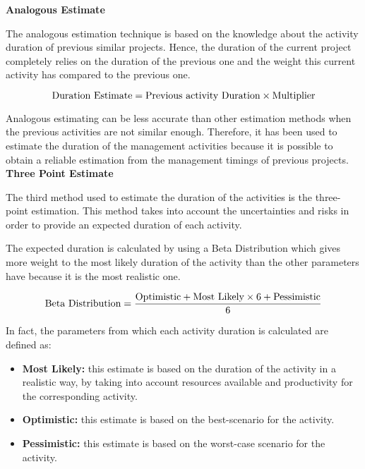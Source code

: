 \textbf{Analogous Estimate}

The analogous estimation technique is based on the knowledge about the activity duration of previous similar projects. Hence, the duration of the current project completely relies on the duration of the previous one and the weight this current activity has compared to the previous one. 

\begin{equation}
\centering
\notag \text{Duration Estimate}=\text{Previous activity Duration} \times \text{Multiplier}
\end{equation}

Analogous estimating can be less accurate than other estimation methods when the previous activities are not similar enough. Therefore, it has been used to estimate the duration of the management activities because it is possible to obtain a reliable estimation from the management timings of previous projects. \\

\textbf{Three Point Estimate}

The third method used to estimate the duration of the activities is the three-point estimation. This method takes into account the uncertainties and risks in order to provide an expected duration of each activity. 

The expected duration is calculated by using a Beta Distribution which gives more weight to the most likely duration of the activity than the other parameters have because it is the most realistic one.

\begin{equation}
\centering
\notag \text{Beta Distribution}=\frac{\text{Optimistic} + \text{Most Likely} \times 6 + \text{Pessimistic}}{6}
\end{equation}

In fact, the parameters from which each activity duration is calculated are defined as: 

\begin{itemize}

\item \textbf{Most Likely:} this estimate is based on the duration of the activity in a realistic way, by taking into account resources available and productivity for the corresponding activity. 

\item \textbf{Optimistic:} this estimate is based on the best-scenario for the activity. 

\item \textbf{Pessimistic:} this estimate is based on the worst-case scenario for the activity. 

\end{itemize}

